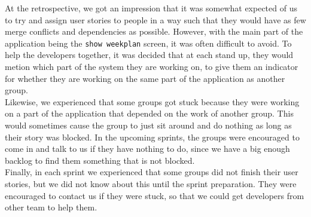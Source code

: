 At the retrospective, we got an impression that it was somewhat expected of us to try and assign user stories to people in a way such that they would have as few merge conflicts and dependencies as possible.
However, with the main part of the application being the \texttt{show weekplan} screen, it was often difficult to avoid. 
To help the developers together, it was decided that at each stand up, they would metion which part of the system they are working on, to give them an indicator for whether they are working on the same part of the application as another group.
\\
Likewise, we experienced that some groups got stuck because they were working on a part of the application that depended on the work of another group.
This would sometimes cause the group to just sit around and do nothing as long as their story was blocked.
In the upcoming sprints, the groups were encouraged to come in and talk to us if they have nothing to do, since we have a big enough backlog to find them something that is not blocked.
\\
Finally, in each sprint we experienced that some groups did not finish their user stories, but we did not know about this until the sprint preparation.
They were encouraged to contact us if they were stuck, so that we could get developers from other team to help them.
\\\\
